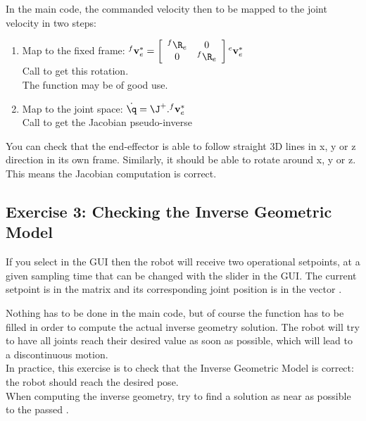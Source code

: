 \documentclass{ecnreport}
\begin{document}
  
  In the main code, the commanded velocity then to be mapped to the joint velocity in two steps:
  \begin{enumerate}
    \item Map to the fixed frame: ${}^f\mathbf{v}_e^* = \left[\begin{array}{cc}{}^f\R_e & 0 \\ 0 & {}^f\R_e\end{array}\right]{}^e\mathbf{v}_e^*$\\
    Call  to get this rotation.\\
    The  function may be of good use.
    \item Map to the joint space: $\dot\q = \J^+.{}^f\mathbf{v}_e^*$\\
    Call  to get the Jacobian pseudo-inverse
  \end{enumerate}
  You can check that the end-effector is able to follow straight 3D lines in x, y or z direction in its own frame.
  Similarly, it should be able to rotate around x, y or z. This means the Jacobian computation is correct.
  
  \newpage
  \subsection*{Exercise 3: Checking the Inverse Geometric Model}
  
  If you select  in the GUI then the robot will receive two operational setpoints, at a given sampling time that can be changed with the  slider in the GUI. The current setpoint is in the matrix  and its corresponding joint position is in the vector . 
  
  Nothing has to be done in the main code, but of course the  function has to be filled in order to compute the actual inverse geometry solution. The robot will try to have all joints reach their desired value as soon as possible, which will lead to a discontinuous motion.\\
  
  In practice, this exercise is to check that the Inverse Geometric Model is correct: the robot should reach the desired pose.\\
  
  When computing the inverse geometry, try to find a solution as near as possible to the passed .\\
  
\end{document}
